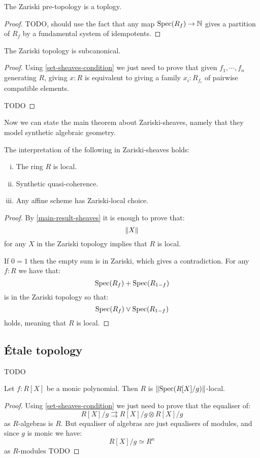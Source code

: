 \begin{lemma}
The Zariski pre-topology is a toplogy.
\end{lemma}

\begin{proof}
TODO, should use the fact that any map $\operatorname{Spec}(R_f)\to\mathbb{N}$ gives a partition of $R_f$ by a fundamental system of idempotents.
\end{proof}

\begin{lemma}
The Zariski topology is subcanonical.
\end{lemma}

\begin{proof}
Using \cref{set-sheaves-condition} we just need to prove that given $f_1,\cdots,f_n$ generating $R$, giving $x:R$ is equivalent to giving a family $x_i:R_{f_i}$ of pairwise compatible elements. 

TODO
\end{proof}

Now we can state the main theorem about Zariski-sheaves, namely that they model synthetic algebraic geometry.

\begin{theorem}
The interpretation of the following in Zariski-sheaves holds:
\begin{enumerate}[(i)]
\item The ring $R$ is local.
\item Synthetic quasi-coherence.
\item Any affine scheme has Zariski-local choice.
\end{enumerate}
\end{theorem}

\begin{proof}
By \cref{main-result-sheaves} it is enough to prove that:
\[\lVert X \rVert\]
for any $X$ in the Zariski topology implies that $R$ is local. 

If $0=1$ then the empty sum is in Zariski, which gives a contradiction. For any $f:R$ we have that:
\[\operatorname{Spec}(R_f)+\operatorname{Spec}(R_{1-f})\]
is in the Zariski topology so that:
\[\operatorname{Spec}(R_f) \lor \operatorname{Spec}(R_{1-f})\]
holds, meaning that $R$ is local.
\end{proof}

\subsection{Étale topology}

TODO

\begin{lemma}
Let $f:R[X]$ be a monic polynomial. Then $R$ is $\lVert \operatorname{Spec}(R[X]/g) \rVert$-local.
\end{lemma}

\begin{proof}
Using \cref{set-sheaves-condition} we just need to prove that the equaliser of:
\[R[X]/g \rightrightarrows R[X]/g \otimes R[X]/g\]
as $R$-algebras is $R$. But equaliser of algebras are just equalisers of modules, and since $g$ is monic we have:
\[R[X]/g \simeq R^n\]
as $R$-modules TODO
\end{proof}

